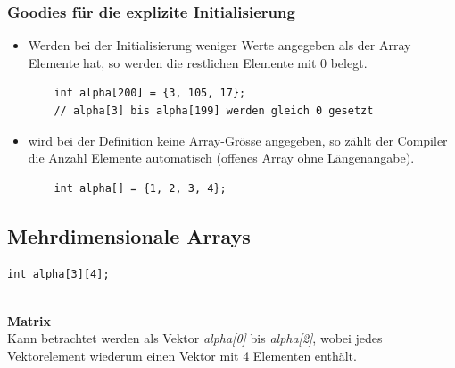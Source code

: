 \subsubsection{Goodies für die explizite Initialisierung}
\begin{itemize}
	\item Werden bei der Initialisierung weniger Werte angegeben als der Array Elemente hat, so werden die restlichen Elemente mit 0 belegt.
	\noindent
	\begin{minipage}{\linewidth}
	\begin{lstlisting}
	int alpha[200] = {3, 105, 17}; 
	// alpha[3] bis alpha[199] werden gleich 0 gesetzt
	\end{lstlisting}
	\end{minipage}
	\item wird bei der Definition keine Array-Grösse angegeben, so zählt der Compiler die Anzahl Elemente automatisch (offenes Array ohne Längenangabe).
	\noindent
	\begin{minipage}{\linewidth}
	\begin{lstlisting}
	int alpha[] = {1, 2, 3, 4};
	\end{lstlisting}
	\end{minipage}
\end{itemize}

\subsection{Mehrdimensionale Arrays}
\noindent
\begin{minipage}{0.2\linewidth}
\begin{lstlisting}
int alpha[3][4];
\end{lstlisting}
\end{minipage}
\hspace{0.01\linewidth}
\begin{minipage}{0.3\linewidth}
	
\end{minipage}\\
\textbf{Matrix}\\
Kann betrachtet werden als Vektor \emph{alpha[0]} bis \emph{alpha[2]}, wobei jedes Vektorelement wiederum einen Vektor mit 4 Elementen enthält.

